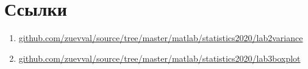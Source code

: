 \documentclass[zuev_report2.tex]{subfiles}
\begin{document}
\newpage
\section{Ссылки}
\begin{enumerate}
	\item \href{https://github.com/zuevval/source/tree/master/matlab/statistics2020/lab2variance}{github.com/zuevval/source/tree/master/matlab/statistics2020/lab2variance} \label{link:lab2}
	
	\item \href{https://github.com/zuevval/source/tree/master/matlab/statistics2020/lab3boxplot}{github.com/zuevval/source/tree/master/matlab/statistics2020/lab3boxplot} \label{link:lab3}
\end{enumerate}
\end{document}
